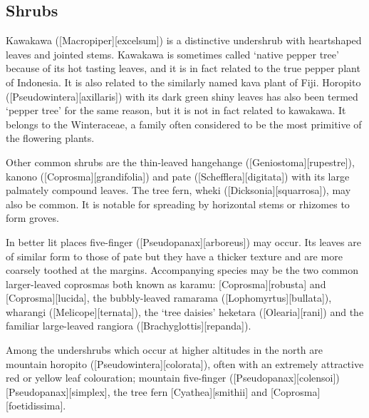 \subsection{Shrubs}

Kawakawa ([Macropiper][excelsum]) is a distinctive undershrub with heartshaped leaves and jointed stems.
Kawakawa is sometimes called `native pepper tree' because of its hot tasting leaves, and it is in fact related to the true pepper plant of Indonesia.
It is also related to the similarly named kava plant of Fiji.
Horopito ([Pseudowintera][axillaris]) with its dark green shiny leaves has also been termed `pepper tree' for the same reason, but it is not in fact related to kawakawa.
It belongs to the Winteraceae, a family often considered to be the most primitive of the flowering plants.

Other common shrubs are the thin-leaved hangehange ([Geniostoma][rupestre]), kanono ([Coprosma][grandifolia]) and pate ([Schefflera][digitata]) with its large palmately compound leaves.
The tree fern, wheki ([Dicksonia][squarrosa]), may also be common.
It is notable for spreading by horizontal stems or rhizomes to form groves.

In better lit places five-finger ([Pseudopanax][arboreus]) may occur.
Its leaves are of similar form to those of pate but they have a thicker texture and are more coarsely toothed at the margins.
Accompanying species may be the two common larger-leaved coprosmas both known as karamu: [Coprosma][robusta] and [Coprosma][lucida], the bubbly-leaved ramarama ([Lophomyrtus][bullata]), wharangi ([Melicope][ternata]), the `tree daisies' heketara ([Olearia][rani]) and the familiar large-leaved rangiora ([Brachyglottis][repanda]).

Among the undershrubs which occur at higher altitudes in the north are mountain horopito ([Pseudowintera][colorata]), often with an extremely attractive red or yellow leaf colouration; mountain five-finger ([Pseudopanax][colensoi]) [Pseudopanax][simplex], the tree fern [Cyathea][smithii] and [Coprosma][foetidissima].

